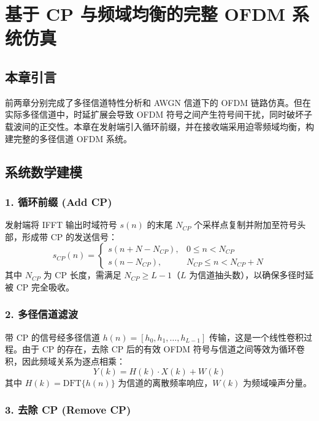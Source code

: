 \documentclass[a4paper, 11pt]{ctexart}
\begin{document}
\section{基于 CP 与频域均衡的完整 OFDM 系统仿真}

\subsection{本章引言}

前两章分别完成了多径信道特性分析和 AWGN 信道下的 OFDM 链路仿真。但在实际多径信道中，时延扩展会导致 OFDM 符号之间产生符号间干扰，同时破坏子载波间的正交性。本章在发射端引入循环前缀，并在接收端采用迫零频域均衡，构建完整的多径信道 OFDM 系统。

\subsection{系统数学建模}

\subsubsection{1. 循环前缀 (Add CP)}

发射端将 IFFT 输出时域符号 $s(n)$ 的末尾 $N_{CP}$ 个采样点复制并附加至符号头部，形成带 CP 的发送信号：
\begin{equation}
    s_{CP}(n) = \begin{cases} s(n + N - N_{CP}), & 0 \le n < N_{CP} \\ s(n - N_{CP}), & N_{CP} \le n < N_{CP} + N \end{cases}
\end{equation}
其中 $N_{CP}$ 为 CP 长度，需满足 $N_{CP} \ge L - 1$（$L$ 为信道抽头数），以确保多径时延被 CP 完全吸收。

\subsubsection{2. 多径信道滤波}

带 CP 的信号经多径信道 $h(n) = [h_0, h_1, \dots, h_{L-1}]$ 传输，这是一个线性卷积过程。由于 CP 的存在，去除 CP 后的有效 OFDM 符号与信道之间等效为循环卷积，因此频域关系为逐点相乘：
\begin{equation}
    Y(k) = H(k) \cdot X(k) + W(k)
\end{equation}
其中 $H(k) = \text{DFT}\{h(n)\}$ 为信道的离散频率响应，$W(k)$ 为频域噪声分量。

\subsubsection{3. 去除 CP (Remove CP)}
\end{document}
